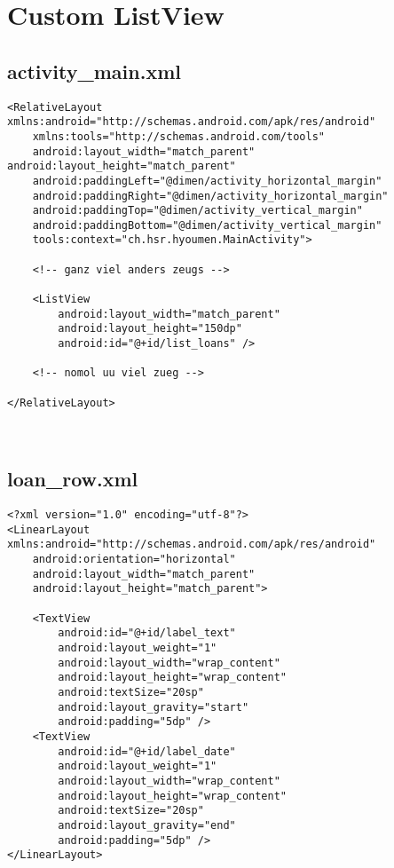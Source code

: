 \documentclass{report}
\begin{document}
\newpage

\section*{Custom ListView}

\subsection*{activity\_main.xml}

\begin{lstlisting}
<RelativeLayout xmlns:android="http://schemas.android.com/apk/res/android" 
	xmlns:tools="http://schemas.android.com/tools" 
	android:layout_width="match_parent" android:layout_height="match_parent" 
	android:paddingLeft="@dimen/activity_horizontal_margin" 
	android:paddingRight="@dimen/activity_horizontal_margin"
	android:paddingTop="@dimen/activity_vertical_margin" 
	android:paddingBottom="@dimen/activity_vertical_margin"
	tools:context="ch.hsr.hyoumen.MainActivity">

	<!-- ganz viel anders zeugs -->

	<ListView
		android:layout_width="match_parent"
		android:layout_height="150dp"
		android:id="@+id/list_loans" />

	<!-- nomol uu viel zueg -->

</RelativeLayout>
\end{lstlisting}

~\par
\subsection*{loan\_row.xml}
\begin{lstlisting}
<?xml version="1.0" encoding="utf-8"?>
<LinearLayout xmlns:android="http://schemas.android.com/apk/res/android"
	android:orientation="horizontal"
	android:layout_width="match_parent"
	android:layout_height="match_parent">

	<TextView
		android:id="@+id/label_text"
		android:layout_weight="1"
		android:layout_width="wrap_content"
		android:layout_height="wrap_content"
		android:textSize="20sp"
		android:layout_gravity="start"
		android:padding="5dp" />
	<TextView
		android:id="@+id/label_date"
		android:layout_weight="1"
		android:layout_width="wrap_content"
		android:layout_height="wrap_content"
		android:textSize="20sp"
		android:layout_gravity="end"
		android:padding="5dp" />
</LinearLayout> 

\end{lstlisting}
\end{document}
